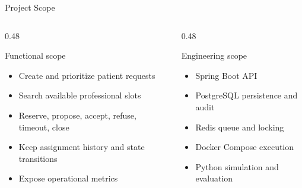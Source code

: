 \documentclass[aspectratio=169,11pt]{beamer}
\begin{document}
\begin{frame}{Project Scope}
  \begin{columns}[T]
    \begin{column}{0.48\textwidth}
      \begin{block}{Functional scope}
        \begin{itemize}
          \item Create and prioritize patient requests
          \item Search available professional slots
          \item Reserve, propose, accept, refuse, timeout, close
          \item Keep assignment history and state transitions
          \item Expose operational metrics
        \end{itemize}
      \end{block}
    \end{column}
    \begin{column}{0.48\textwidth}
      \begin{block}{Engineering scope}
        \begin{itemize}
          \item Spring Boot API
          \item PostgreSQL persistence and audit
          \item Redis queue and locking
          \item Docker Compose execution
          \item Python simulation and evaluation
        \end{itemize}
      \end{block}
    \end{column}
  \end{columns}
\end{frame}
\end{document}

